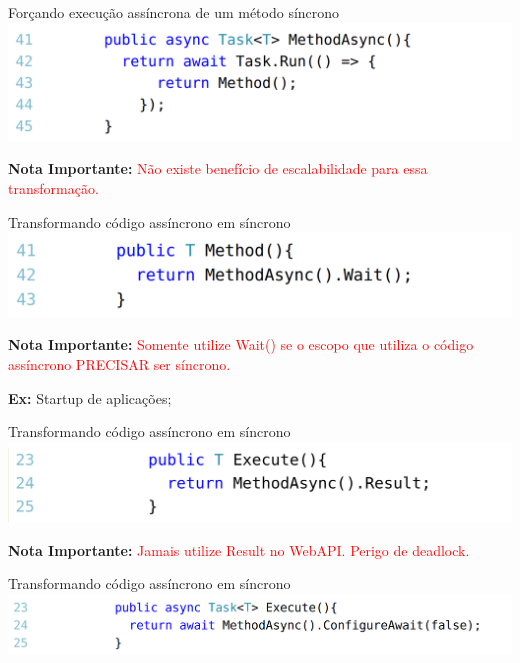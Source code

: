 \documentclass[10pt]{beamer}
\begin{document}
\begin{frame}{Forçando execução assíncrona de um método síncrono}
	\includegraphics[scale=0.27]{imgs/02-syncToAsync.png}	
	\vspace{0.5cm}
	
	\textbf{Nota Importante:} \textcolor{red}{Não existe benefício de escalabilidade para essa transformação.}
\end{frame}

\begin{frame}{Transformando código assíncrono em síncrono}
	\includegraphics[scale=0.27]{imgs/03-asyncToSync.png}
	\vspace{0.5cm}
	
	\textbf{Nota Importante:} \textcolor{red}{Somente utilize Wait() se o escopo que utiliza o código assíncrono PRECISAR ser síncrono.}
	\vspace{0.2cm}
	
	\textbf{Ex:} Startup de aplicações;
	
\end{frame}

\begin{frame}{Transformando código assíncrono em síncrono}
	\includegraphics[scale=0.22]{imgs/03-asyncToSync2.png}
	\vspace{0.5cm}
	
	\textbf{Nota Importante:} \textcolor{red}{Jamais utilize Result no WebAPI. Perigo de deadlock.}
\end{frame}

\begin{frame}{Transformando código assíncrono em síncrono}
	\includegraphics[scale=0.27]{imgs/03-asyncToSync3.png}
\end{frame}
\end{document}
